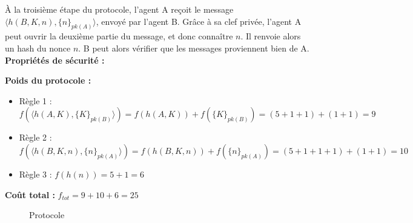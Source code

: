 \documentclass[10pt,a4paper]{article}
\begin{document}
À la troisième étape du protocole, l'agent A reçoit le message $\langle h(B, K, n), \{n\}_{pk(A)} \rangle $, envoyé par l'agent B.
Grâce à sa clef privée, l'agent A peut ouvrir la deuxième partie du message, et donc connaître $n$.
Il renvoie alors un hash du nonce $n$. B peut alors vérifier que les messages proviennent bien de A.\\


\textbf{Propriétés de sécurité :}

\textbf{Poids du protocole :}
\begin{itemize}
\item Règle 1 : $f( \langle h(A, K), \{K\}_{pk(B)} \rangle ) = f ( h(A, K) ) + f ( \{K\}_{pk(B)} ) = (5 + 1 + 1) + (1 + 1) = 9 $
\item Règle 2 : $f(\langle h(B, K, n), \{n\}_{pk(A)} \rangle) = f(h(B, K, n)) + f(\{n\}_{pk(A)}) = (5 + 1 + 1 + 1) + (1 + 1) = 10 $
\item Règle 3 : $f(h(n)) = 5 + 1 = 6$
\end{itemize}

\textbf{Coût total :} $f_{tot} = 9 + 10 + 6 = 25$



\begin{figure}[!ht]
\centering
\begin{msc}{Protocole}
  \nextlevel
  \nextlevel[2]
  \nextlevel
  \nextlevel[2]
  \nextlevel
  \nextlevel
\end{msc}
\end{figure}








\end{document}
